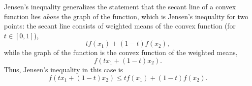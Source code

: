\documentclass[12pt]{article}
\newenvironment{remark}[1][]{%
  \begin{remarkbox}[title={\bfseries Remark~\thetcbcounter\ifx\relax#1\relax\else\ (#1)\fi}]%
}{%
  \end{remarkbox}%
}
\begin{document}
\begin{remark}
\noindent\begin{minipage}[t]{0.49\linewidth}\vspace{0pt}
Jensen's inequality generalizes the statement that the secant line of a convex function lies \textit{above} the graph of the function, which is Jensen's inequality for two points: the secant line consists of weighted means of the convex function (for $t \in [0,1]$),
\[
 t f(x_1) + (1 - t) f(x_2),
\]
while the graph of the function is the convex function of the weighted means,
\[
 f(t x_1 + (1 - t) x_2).
\]
Thus, Jensen's inequality in this case is
\[
 f(t x_1 + (1 - t) x_2) \leq t f(x_1) + (1 - t) f(x_2).
\]
\end{minipage}\hfill
\begin{minipage}[t]{0.49\linewidth}\vspace{0pt}
\end{minipage}
\end{remark}
\end{document}
